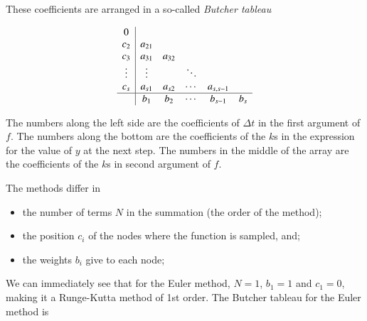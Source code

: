 

These coefficients are arranged in a so-called {\it Butcher tableau}

\[
\begin{array}
{c|ccccc}
0\\
c_2 & a_{21}\\
c_3 &a_{31} &a_{32} \\
\vdots & \vdots & &\ddots \\ 
c_s& a_{s1}& a_{s2}& \cdots &a_{s,s-1}\\
\hline
& b_1 &b_2 &\cdots &b_{s-1} & b_s 
\end{array}
\]

The numbers along the left side are the coefficients of $\Delta t$ in
the first argument of $f$. The numbers along the bottom are the
coefficients of the $k$s in the expression for the value of $y$ at the
next step. The numbers in the middle of the array are the coefficients
of the $k$s in second argument  of $f$.







The methods differ in

\begin{itemize}
\item the number of terms $N$ in the summation (the order of the method);
\item the position $c_i$ of the nodes where the function is sampled,  and; 
\item the weights $b_i$ give to each node;
\end{itemize}


We can immediately see that for the Euler method, $N=1$, $b_1 =1$ and
$c_1 = 0$, making it a Runge-Kutta method of 1st order. The Butcher tableau for the
Euler method is

